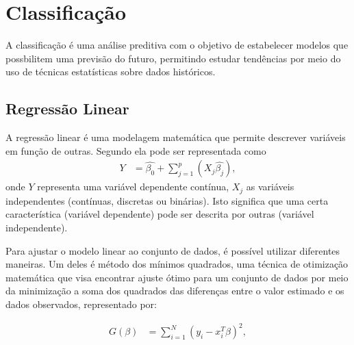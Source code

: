 \section{Classificação}

A classificação é uma análise preditiva com o objetivo de estabelecer modelos que possbilitem uma previsão do futuro, permitindo estudar tendências por meio do uso de técnicas estatísticas sobre dados históricos.

\subsection{Regressão Linear}


A regressão linear é uma modelagem matemática \footnotemark {} que permite descrever variáveis em função de outras. Segundo  ela pode ser representada como
\begin{equation}
  \label{eq:regressao_linear}
  \begin{aligned}
Y &= \hat{\beta_{0}} + \sum_{j=1}^{p} (X_{j}\hat{\beta_{j}}), 
  \end{aligned}  
\end{equation}
onde \begin{math}Y\end{math} representa uma variável dependente contínua, \begin{math}X_{j}\end{math} as variáveis independentes (contínuas, discretas ou binárias). Isto significa que uma certa característica (variável dependente) pode ser descrita por outras (variável independente).

Para ajustar o modelo linear ao conjunto de dados, é possível utilizar diferentes maneiras. Um deles é método dos mínimos quadrados, uma técnica de otimização matemática que visa encontrar ajuste ótimo para um conjunto de dados por meio da minimização a soma dos quadrados das diferenças entre o valor estimado e os dados observados, representado por:

\begin{equation}
  \label{eq:minimos_quadrados}
  \begin{aligned}
G(\beta) &= \sum_{i=1}^{N} (y_{i}-x_{i}^{T}\beta)^{2}, 
  \end{aligned}  
\end{equation}

